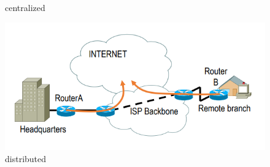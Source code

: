 \documentclass{article}
\begin{document}
\begin{itemize}
\begin{itemize}
\begin{figure}[h]
\begin{minipage}[b]{0.45\textwidth}
                \caption{centralized}
            \end{minipage}
            \hspace{0.05\textwidth}
            \begin{minipage}[b]{0.45\textwidth}
                \centering
                \includegraphics[width=\textwidth]{figure/distributed_VPN.png}
                \caption{distributed}
            \end{minipage}
        \end{figure}
    \end{itemize}
\end{itemize}
\end{document}
